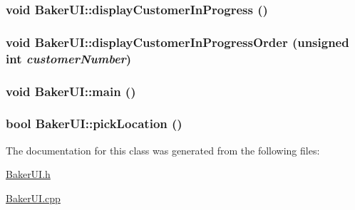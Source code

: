 \hypertarget{class_baker_u_i_49612691d8a1c466378d3e4507aff847}{
\subsubsection[displayCustomerInProgress]{\setlength{\rightskip}{0pt plus 5cm}void Baker\-UI::display\-Customer\-In\-Progress ()}}
\label{class_baker_u_i_49612691d8a1c466378d3e4507aff847}


\hypertarget{class_baker_u_i_12edcb5c93a8a60d06b8c9de906c4be0}{
\subsubsection[displayCustomerInProgressOrder]{\setlength{\rightskip}{0pt plus 5cm}void Baker\-UI::display\-Customer\-In\-Progress\-Order (unsigned int {\em customer\-Number})}}
\label{class_baker_u_i_12edcb5c93a8a60d06b8c9de906c4be0}


\hypertarget{class_baker_u_i_ea83b916b3f52eec32ae6d54d59b4453}{
\subsubsection[main]{\setlength{\rightskip}{0pt plus 5cm}void Baker\-UI::main ()}}
\label{class_baker_u_i_ea83b916b3f52eec32ae6d54d59b4453}


\hypertarget{class_baker_u_i_74d0d6b7d7493e8a9703bc8fbeb79f2e}{
\subsubsection[pickLocation]{\setlength{\rightskip}{0pt plus 5cm}bool Baker\-UI::pick\-Location ()}}
\label{class_baker_u_i_74d0d6b7d7493e8a9703bc8fbeb79f2e}




The documentation for this class was generated from the following files:\begin{CompactItemize}
\item 
\hyperlink{_baker_u_i_8h}{Baker\-UI.h}\item 
\hyperlink{_baker_u_i_8cpp}{Baker\-UI.cpp}\end{CompactItemize}

